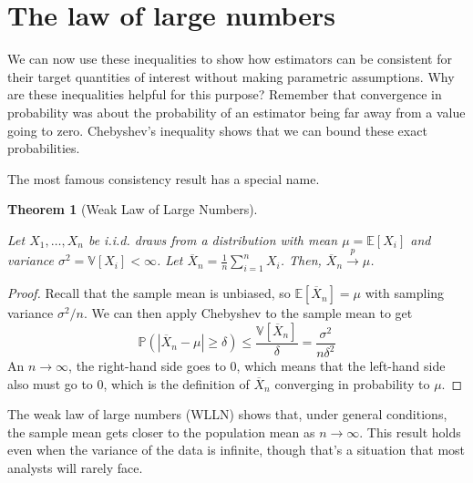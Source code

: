 \documentclass[
  letterpaper,
  DIV=11,
  numbers=noendperiod]{scrreprt}
\newcommand{\E}{\mathbb{E}}
\newcommand{\V}{\mathbb{V}}
\renewcommand{\P}{\mathbb{P}}
\newcommand{\Xbar}{\overline{X}}
\newcommand{\inprob}{\overset{p}{\to}}
\theoremstyle{definition}
\theoremstyle{definition}
\theoremstyle{plain}
\newtheorem{theorem}{Theorem}[chapter]
\theoremstyle{remark}
\begin{document}
\hypertarget{the-law-of-large-numbers}{%
\section{The law of large numbers}\label{the-law-of-large-numbers}}

We can now use these inequalities to show how estimators can be
consistent for their target quantities of interest without making
parametric assumptions. Why are these inequalities helpful for this
purpose? Remember that convergence in probability was about the
probability of an estimator being far away from a value going to zero.
Chebyshev's inequality shows that we can bound these exact
probabilities.

The most famous consistency result has a special name.

\begin{theorem}[Weak Law of Large
Numbers]\protect\hypertarget{thm-lln}{}\label{thm-lln}

Let \(X_1, \ldots, X_n\) be i.i.d. draws from a distribution with mean
\(\mu = \E[X_i]\) and variance \(\sigma^2 = \V[X_i] < \infty\). Let
\(\Xbar_n = \frac{1}{n} \sum_{i =1}^n X_i\). Then,
\(\Xbar_n \inprob \mu\).

\end{theorem}

\begin{proof}

Recall that the sample mean is unbiased, so \(\E[\Xbar_n] = \mu\) with
sampling variance \(\sigma^2/n\). We can then apply Chebyshev to the
sample mean to get \[
\P(|\Xbar_n - \mu| \geq \delta) \leq \frac{\V[\Xbar_n]}{\delta} = \frac{\sigma^2}{n\delta^2}
\] An \(n\rightarrow\infty\), the right-hand side goes to 0, which means
that the left-hand side also must go to 0, which is the definition of
\(\Xbar_n\) converging in probability to \(\mu\).

\end{proof}

The weak law of large numbers (WLLN) shows that, under general
conditions, the sample mean gets closer to the population mean as
\(n\rightarrow\infty\). This result holds even when the variance of the
data is infinite, though that's a situation that most analysts will
rarely face.
\end{document}
